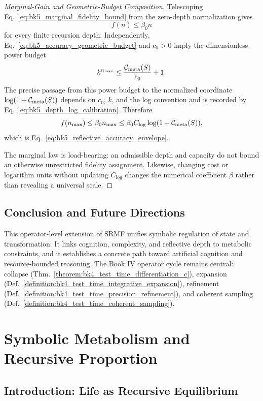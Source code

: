 \begin{proof}[Marginal-Gain and Geometric-Budget Composition]
\label{proof:bk5_metabolic_constraints_reflective_accuracy}
Telescoping Eq.~\eqref{eq:bk5_marginal_fidelity_bound} from the zero-depth
normalization gives
\[
 f(n)\leq\beta_0 n
\]
for every finite recursion depth.  Independently,
Eq.~\eqref{eq:bk5_accuracy_geometric_budget} and $c_0>0$ imply the
dimensionless power budget
\[
 k^{n_{\max}}\leq\frac{\mathcal{C}_{\text{meta}}(S)}{c_0}+1.
\]
The precise passage from this power budget to the normalized coordinate
$\log(1+\mathcal{C}_{\text{meta}}(S))$ depends on $c_0$, $k$, and the log convention and is recorded
by Eq.~\eqref{eq:bk5_depth_log_calibration}.  Therefore
\[
 f(n_{\max})\leq\beta_0n_{\max}
 \leq\beta_0C_{\log}\log(1+\mathcal{C}_{\text{meta}}(S)),
\]
which is Eq.~\eqref{eq:bk5_reflective_accuracy_envelope}.

The marginal law is load-bearing: an admissible depth and capacity do not bound
an otherwise unrestricted fidelity assignment.  Likewise, changing cost or
logarithm units without updating $C_{\log}$ changes the numerical coefficient
$\beta$ rather than revealing a universal scale.
\end{proof}
\subsection{Conclusion and Future Directions}
\label{subsec:bk5_conclustion_and_future_directions}
This operator-level extension of SRMF unifies symbolic regulation of state and transformation. It links cognition, complexity, and reflective depth to metabolic constraints, and it establishes a concrete path toward artificial cognition and resource-bounded reasoning.
The Book IV operator cycle remains central: collapse (Thm.~\ref{theorem:bk4_test_time_differentiation_c}), expansion (Def.~\ref{definition:bk4_test_time_integrative_expansion}), refinement (Def.~\ref{definition:bk4_test_time_precision_refinement}), and coherent sampling (Def.~\ref{definition:bk4_test_time_coherent_sampling}).

\section{Symbolic Metabolism and Recursive Proportion}
\label{sec:bk5_golden_ratio}

\subsection{Introduction: Life as Recursive Equilibrium}
\label{subsec:bk5_intro_recursive_equilibrium}

